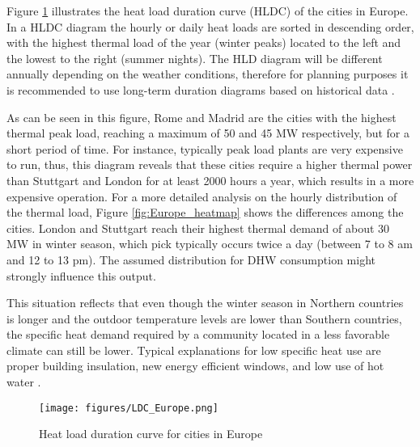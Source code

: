 \documentclass{article}
\begin{document}
Figure \ref{fig:LDC_Europe} illustrates the heat load duration curve (HLDC) of the cities in Europe. In a HLDC diagram the hourly or daily heat loads are sorted in descending order, with the highest thermal load of the year (winter peaks) located to the left and the lowest to the right (summer nights). The HLD diagram will be different annually depending on the weather conditions, therefore for planning purposes it is recommended to use long-term duration diagrams based on historical data \cite{werner_district_2013}. 

As can be seen in this figure, Rome and Madrid are the cities with the highest thermal peak load, reaching a maximum of 50 and 45 MW respectively, but for a short period of time. For instance, typically peak load plants are very expensive to run, thus, this diagram reveals that these cities require a higher thermal power than Stuttgart and London for at least 2000 hours a year, which results in a more expensive operation. For a more detailed analysis on the hourly distribution of the thermal load, Figure \ref{fig:Europe_heatmap} shows the differences among the cities. London and Stuttgart reach their highest thermal demand of about 30 MW in winter season, which pick typically occurs twice a day (between 7 to 8 am and 12 to 13 pm). The assumed distribution for DHW consumption might strongly influence this output.

This situation reflects that even though the winter season in Northern countries is longer and the outdoor temperature levels are lower than Southern countries, the specific heat demand required by a community located in a less favorable climate can still be lower. Typical explanations for low specific heat use are proper building insulation, new energy efficient windows, and low use of hot water \cite{werner_district_2013}.

\begin{figure}[H]
\centering
\texttt{[image: figures/LDC\_Europe.png]}
\caption{Heat load duration curve for cities in Europe}
\label{fig:LDC_Europe}
\end{figure}
\end{document}
